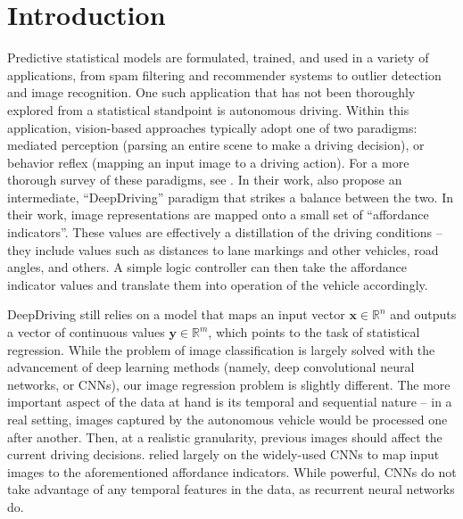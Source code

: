 \documentclass[master]{subfiles}
\begin{document}
\section{Introduction}\label{intro}
Predictive statistical models are formulated, trained, and used in a variety of applications, from spam filtering and recommender systems to outlier detection and image recognition.  One such application that has not been thoroughly explored from a statistical standpoint is autonomous driving.  Within this application, vision-based approaches typically adopt one of two paradigms: mediated perception (parsing an entire scene to make a driving decision), or behavior reflex (mapping an input image to a driving action).  For a more thorough survey of these paradigms, see \cite{deepdriving}.  In their work, \cite{deepdriving} also propose an intermediate, ``DeepDriving'' paradigm that strikes a balance between the two.  In their work, image representations are mapped onto a small set of ``affordance indicators''.  These values are effectively a distillation of the driving conditions -- they include values such as distances to lane markings and other vehicles, road angles, and others.  A simple logic controller can then take the affordance indicator values and translate them into operation of the vehicle accordingly.\par
DeepDriving still relies on a model that maps an input vector $\mathbf{x} \in \mathbb{R}^n$ and outputs a vector of continuous values $\mathbf{y} \in \mathbb{R}^m$, which points to the task of statistical regression.  While the problem of image classification is largely solved with the advancement of deep learning methods (namely, deep convolutional neural networks, or CNNs), our image regression problem is slightly different.  The more important aspect of the data at hand is its temporal and sequential nature -- in a real setting, images captured by the autonomous vehicle would be processed one after another.  Then, at a realistic granularity, previous images should affect the current driving decisions.  \cite{deepdriving} relied largely on the widely-used CNNs to map input images to the aforementioned affordance indicators.  While powerful, CNNs do not take advantage of any temporal features in the data, as recurrent neural networks do.\par
\end{document}
